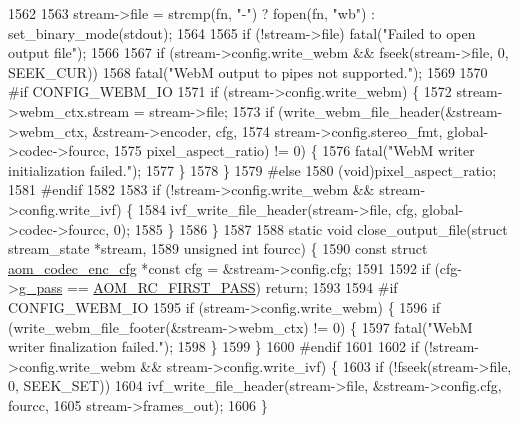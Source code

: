 \begin{DoxyCodeInclude}
{{{{{{{{{{{{{{{{{{{{{{{{{{{{{{{{{{{{1562 
1563   stream->file = strcmp(fn, \textcolor{stringliteral}{"-"}) ? fopen(fn, \textcolor{stringliteral}{"wb"}) : set\_binary\_mode(stdout);
1564 
1565   \textcolor{keywordflow}{if} (!stream->file) fatal(\textcolor{stringliteral}{"Failed to open output file"});
1566 
1567   \textcolor{keywordflow}{if} (stream->config.write\_webm && fseek(stream->file, 0, SEEK\_CUR))
1568     fatal(\textcolor{stringliteral}{"WebM output to pipes not supported."});
1569 
1570 \textcolor{preprocessor}{#if CONFIG\_WEBM\_IO}
1571   \textcolor{keywordflow}{if} (stream->config.write\_webm) \{
1572     stream->webm\_ctx.stream = stream->file;
1573     \textcolor{keywordflow}{if} (write\_webm\_file\_header(&stream->webm\_ctx, &stream->encoder, cfg,
1574         stream->config.stereo\_fmt, global->codec->fourcc,
1575         pixel\_aspect\_ratio) != 0) \{
1576       fatal(\textcolor{stringliteral}{"WebM writer initialization failed."});
1577     \}
1578   \}
1579 \textcolor{preprocessor}{#else}
1580   (void)pixel\_aspect\_ratio;
1581 \textcolor{preprocessor}{#endif}
1582 
1583   \textcolor{keywordflow}{if} (!stream->config.write\_webm && stream->config.write\_ivf) \{
1584     ivf\_write\_file\_header(stream->file, cfg, global->codec->fourcc, 0);
1585   \}
1586 \}
1587 
1588 \textcolor{keyword}{static} \textcolor{keywordtype}{void} close\_output\_file(\textcolor{keyword}{struct} stream\_state *stream,
1589     \textcolor{keywordtype}{unsigned} \textcolor{keywordtype}{int} fourcc) \{
1590   \textcolor{keyword}{const} \textcolor{keyword}{struct }\hyperlink{structaom__codec__enc__cfg}{aom\_codec\_enc\_cfg} *\textcolor{keyword}{const} cfg = &stream->config.cfg;
1591 
1592   \textcolor{keywordflow}{if} (cfg->\hyperlink{structaom__codec__enc__cfg_aad58e4d10c7904d50ce959aef202dc64}{g\_pass} == \hyperlink{group__encoder_gga92b6709b58dc3435e3ba652da562eda1ad342b33a290482c20238bfde5d9bea1e}{AOM\_RC\_FIRST\_PASS}) \textcolor{keywordflow}{return};
1593 
1594 \textcolor{preprocessor}{#if CONFIG\_WEBM\_IO}
1595   \textcolor{keywordflow}{if} (stream->config.write\_webm) \{
1596     \textcolor{keywordflow}{if} (write\_webm\_file\_footer(&stream->webm\_ctx) != 0) \{
1597       fatal(\textcolor{stringliteral}{"WebM writer finalization failed."});
1598     \}
1599   \}
1600 \textcolor{preprocessor}{#endif}
1601 
1602   \textcolor{keywordflow}{if} (!stream->config.write\_webm && stream->config.write\_ivf) \{
1603     \textcolor{keywordflow}{if} (!fseek(stream->file, 0, SEEK\_SET))
1604       ivf\_write\_file\_header(stream->file, &stream->config.cfg, fourcc,
1605           stream->frames\_out);
1606   \}
}}}}}}}}}}}}}}}}}}}}}}}}}}}}}}}}}}}}
\end{DoxyCodeInclude}
